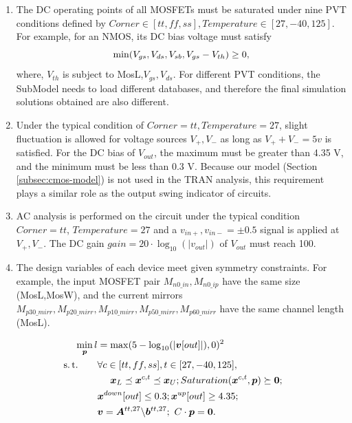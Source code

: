 \begin{enumerate}[partopsep=0pt,topsep=0pt,itemsep=0pt,parsep=0pt]
  \item The DC operating points of all MOSFETs must be saturated under nine PVT conditions defined by $Corner\in[tt,ff,ss],Temperature\in[27,-40,125]$. For example, for an NMOS, its DC bias voltage must satisfy
    \vspace{-1em}
    \[
      \min(V_{gs},V_{ds},V_{sb},V_{gs}-V_{th})\geq0,
      \vspace{-1em}
    \]
    where, $V_{th}$ is subject to MosL,$V_{gs},V_{ds}$. For different PVT conditions, the SubModel needs to load different databases, and therefore the final simulation solutions obtained are also different.
  \item Under the typical condition of $Corner=tt,Temperature=27$, slight fluctuation is allowed for voltage sources $V_+,V_-$ as long as $V_++V_-=5v$ is satisfied. For the DC bias of $V_{out}$, the maximum must be greater than 4.35 V, and the minimum must be less than 0.3 V.
    Because our model (Section \ref{subsec:cmos-model}) is not used in the TRAN analysis, this requirement plays a similar role as the output swing indicator of circuits.
  \item AC analysis is performed on the circuit under the typical condition $Corner=tt$, $Temperature=27$ and a $v_{in+},v_{in-}=\pm0.5$ signal is applied at $V_+,V_-$. The DC gain $gain=20\cdot\log_{10}(|v_{out}|)$ of $V_{out}$ must reach 100.
  \item The design variables of each device meet given symmetry constraints. For example, the input MOSFET pair $M_{n0\_in},M_{n0\_ip}$ have the same size (MosL,MosW), and the current mirrors $M_{p30\_mirr},M_{p20\_mirr},M_{p10\_mirr},M_{p50\_mirr},M_{p60\_mirr}$ have the same channel length (MosL).
\end{enumerate}
\begin{equation}\label{eq:optimization}
  \begin{split}
    \min_{\bm{p}} l &= \max(5-\log_{10}(|\bm{v}[out]|),0)^2 \\
    \st \ \ \ \ \ \ 
    & \forall c\in[tt,ff,ss],t\in[27,-40,125], \\
    & \ \ \ \ \bm{x}_L\preceq\bm{x}^{c,t}\preceq\bm{x}_U;
    Saturation(\bm{x}^{c,t},\bm{p})\succeq\bm{0}; \\
    & \bm{x}^{down}[out]\leq0.3;\bm{x}^{up}[out]\geq4.35; \\
    & \bm{v}=\bm{A}^{tt,27}\backslash\bm{b}^{tt,27}; \ C\cdot\bm{p}=\bm{0}.
  \end{split}
\end{equation}
